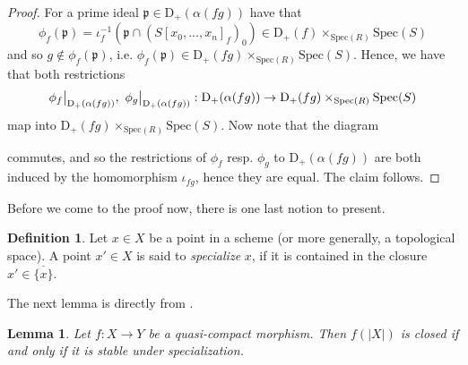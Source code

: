 \documentclass{scrartcl}
\newcommand{\D}[1]{\mathrm{D}_+(#1)}
\newcommand{\p}{\mathfrak{p}}
\newcommand{\Spec}{\mathrm{Spec}}
\newcommand\restr[2]{{
    \left.\kern-\nulldelimiterspace
    #1
    \vphantom{\big|}
    \right|_{#2}
}}
\newtheorem{lemma}[subsection]{Lemma}
\theoremstyle{definition}
\newtheorem{definition}[subsection]{Definition}
\begin{document}
\begin{proof}
    For a prime ideal $\p \in \D{\alpha(fg)}$ have that
    \begin{equation*}
        \phi_f(\p) = \iota_f^{-1}(\p \cap (S[x_0, ..., x_n]_f)_0) \in \D{f} \times_{\Spec(R)} \Spec(S)
    \end{equation*}
    and so $g \notin \phi_f(\p)$, i.e. $\phi_f(\p) \in \D{fg} \times_{\Spec(R)} \Spec(S)$.
    Hence, we have that both restrictions
    \begin{equation*}
        \restr{\phi_f}{\D{\alpha(fg)}}, \ \restr{\phi_g}{\D{\alpha(fg)}}: \D{\alpha(fg)} \to \D{fg} \times_{\Spec(R)} \Spec(S)
    \end{equation*}
    map into $\D{fg} \times_{\Spec(R)} \Spec(S)$.
    Now note that the diagram
    \begin{center}
    \end{center}
    commutes, and so the restrictions of $\phi_f$ resp. $\phi_g$ to $\D{\alpha(fg)}$ are both induced by the homomorphism $\iota_{fg}$, hence they are equal.
    The claim follows.
\end{proof}
Before we come to the proof now, there is one last notion to present.
\begin{definition}
    Let $x \in X$ be a point in a scheme (or more generally, a topological space).
    A point $x' \in X$ is said to \emph{specialize} $x$, if it is contained in the closure $x' \in \overline{\{x\}}$.
\end{definition}
The next lemma is directly from \cite[II.4.5]{hartshorne}.
\begin{lemma}
    \label{prop:im_closed_iff_stable_specialization}
    Let $f: X \to Y$ be a quasi-compact morphism.
    Then $f(|X|)$ is closed if and only if it is stable under specialization.
\end{lemma}
\end{document}
